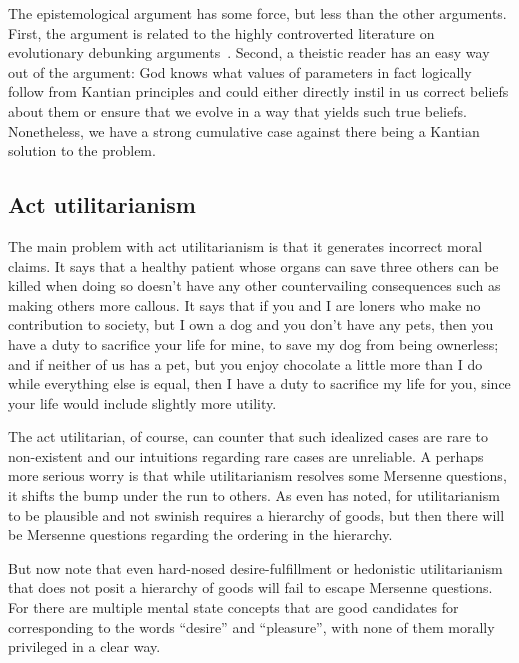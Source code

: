 The epistemological argument has some force, but less than the other arguments. First, the argument is related to the highly controverted
literature on evolutionary debunking arguments~\parencite{PlantingaWarrant,KahaneDebunk,WielenbergDebunk}. Second, a theistic reader has an easy way out of the argument:
God knows what values of parameters in fact logically follow from Kantian principles and could either directly instil in
us correct beliefs about them or ensure that we evolve in a way that yields such true beliefs. Nonetheless, we have
a strong cumulative case against there being a Kantian solution to the problem.

\subsection{Act utilitarianism}\label{sec:act-util}
The main problem with act utilitarianism is that it generates incorrect moral claims. It says that a healthy patient
whose organs can save three others can be killed when doing so doesn't have any other countervailing consequences such
as making others more callous. It says that if you and I are loners who make no contribution to society, but I own
a dog and you don't have any pets, then you have a duty to sacrifice your life for mine, to save my dog from being
ownerless; and if neither of us has a pet, but you enjoy chocolate a little more than I do while everything else is
equal, then I have a duty to sacrifice my life for you, since your life would include slightly more utility.

The act utilitarian, of course, can counter that such idealized cases are rare to non-existent and our intuitions
regarding rare cases are unreliable. A perhaps more serious worry is that while utilitarianism resolves some
Mersenne questions, it shifts the bump under the run to others. As even  has 
noted, for utilitarianism to be plausible and not swinish requires a hierarchy of goods, but then 
there will be Mersenne questions regarding the ordering in the hierarchy.

But now note that even hard-nosed desire-fulfillment or hedonistic utilitarianism that does not posit a hierarchy
of goods will fail to escape Mersenne
questions. For there are multiple mental state concepts that are good candidates for corresponding to the words ``desire'' and ``pleasure'', with none of them morally privileged in a clear way.

